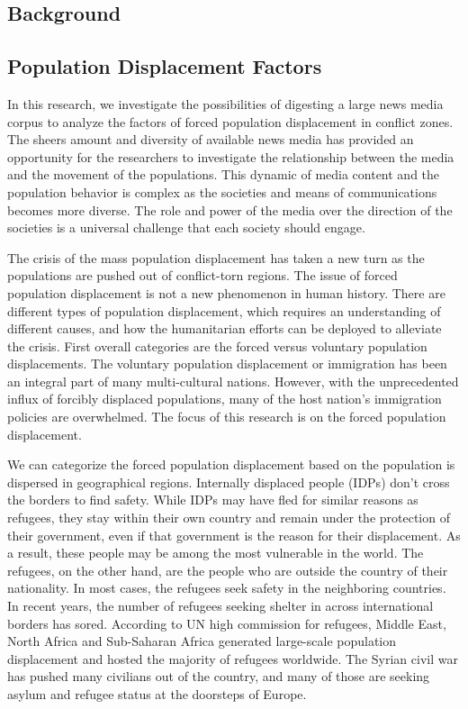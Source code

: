 \begin{appendices}
\section{Background}

\subsection{Population Displacement Factors}
In this research, we investigate the possibilities of digesting a large news media corpus to analyze the factors of forced population displacement in conflict zones. The sheers amount and diversity of available news media has provided an opportunity for the researchers to investigate the relationship between the media and the movement of the populations. This dynamic of media content and the population behavior is complex as the societies and means of communications becomes more diverse. The role and power of the media over the direction of the societies is a universal challenge that each society should engage. 

The crisis of the mass population displacement has taken a new turn as the populations are pushed out of conflict-torn regions. The issue of forced population displacement is not a new phenomenon in human history.  There are different types of population displacement, which requires an understanding of different causes, and how the humanitarian efforts can be deployed to alleviate the crisis.  First overall categories are the forced versus voluntary population displacements. The voluntary population displacement or immigration has been an integral part of many multi-cultural nations. However, with the unprecedented influx of forcibly displaced populations, many of the host nation’s immigration policies are overwhelmed. The focus of this research is on the forced population displacement. 

We can categorize the forced population displacement based on the population is dispersed in geographical regions. Internally displaced people (IDPs) don’t cross the borders to find safety. While IDPs may have fled for similar reasons as refugees, they stay within their own country and remain under the protection of their government, even if that government is the reason for their displacement. As a result, these people may be among the most vulnerable in the world. The refugees, on the other hand, are the people who are outside the country of their nationality. In most cases, the refugees seek safety in the neighboring countries. In recent years, the number of refugees seeking shelter in across international borders has sored. According to UN high commission for refugees, Middle East, North Africa and Sub-Saharan Africa generated large-scale population displacement and hosted the majority of refugees worldwide. The Syrian civil war has pushed many civilians out of the country, and many of those are seeking asylum and refugee status at the doorsteps of Europe. 


\end{appendices}
